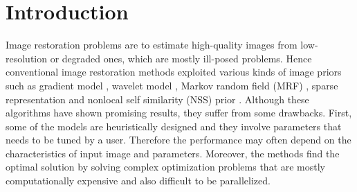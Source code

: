 \documentclass[journal]{IEEEtran}
\begin{document}
\section{Introduction}
  
Image restoration problems are to estimate high-quality images from 
low-resolution or degraded ones, which are mostly ill-posed problems.
Hence conventional image restoration methods exploited
various kinds of image priors such as
gradient model \cite{rudin1992nonlinear,osher2005iterative,weiss2007makes}, 
wavelet model \cite{chang2000adaptive,remenyi2014image}, 
Markov random field (MRF) \cite{roth2005fields,lan2006efficient,li2009markov},
sparse representation \cite{elad2006image,mairal2009non,dong2013nonlocally} 
and nonlocal self similarity (NSS) prior \cite{buades2005non,dabov2007image,gu2014weighted}. 
Although these algorithms have shown promising results, 
they suffer from some drawbacks. First, some of the models are heuristically 
designed and they involve parameters that needs to be tuned by a user. 
Therefore the performance may often depend on the characteristics of
input image and parameters. Moreover, the methods find the optimal solution 
by solving complex optimization problems that are
mostly computationally expensive and also difficult to be parallelized.
 
\end{document}

